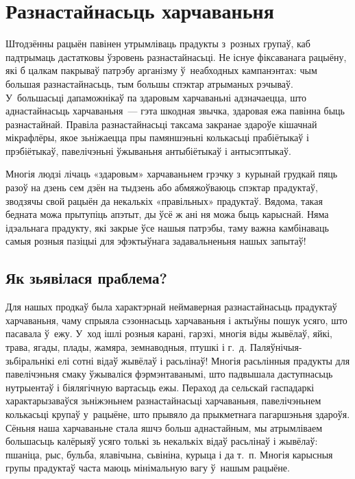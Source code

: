 \chapter{Разнастайнасьць харчаваньня}

Штодзённы рацыён павінен утрымліваць прадукты з~розных групаў, каб падтрымаць дастатковы ўзровень разнастайнасьці. Не існуе фіксаванага рацыёну, які б цалкам пакрываў патрэбу арганізму ў~неабходных кампанэнтах: чым большая разнастайнасьць, тым большы спэктар атрыманых рэчываў. У~большасьці дапаможнікаў па здаровым харчаваньні адзначаецца, што аднастайнасьць харчаваньня~--- гэта шкодная звычка, здаровая ежа павінна быць разнастайнай. Правіла разнастайнасьці таксама закранае здароўе кішачнай мікрафлёры, якое зьніжаецца пры памяншэньні колькасьці прабіётыкаў і прэбіётыкаў, павелічэньні ўжываньня антыбіётыкаў і антысэптыкаў.

Многія людзі лічаць «здаровым» харчаваньнем грэчку з~курынай грудкай пяць разоў на дзень сем дзён на тыдзень або абмяжоўваюць спэктар прадуктаў, зводзячы свой рацыён да некалькіх «правільных» прадуктаў. Вядома, такая бедната можа прытупіць апэтыт, ды ўсё ж ані ня можа быць карыснай. Няма ідэальнага прадукту, які закрые ўсе нашыя патрэбы, таму важна камбінаваць самыя розныя пазіцыі для эфэктыўнага задавальненьня нашых запытаў!

\section{Як зьявілася праблема?}

Для нашых продкаў была характэрнай неймаверная разнастайнасьць прадуктаў харчаваньня, чаму спрыяла сэзоннасьць харчаваньня і актыўны пошук усяго, што пасавала ў~ежу. У~ход ішлі розныя карані, гарэхі, многія віды жывёлаў, яйкі, трава, ягады, плады, жамяра, земнаводныя, птушкі і г.~д. Паляўнічыя-зьбіральнікі елі сотні відаў жывёлаў і расьлінаў! Многія расьлінныя прадукты для павелічэньня смаку ўжываліся фэрмэнтаванымі, што падвышала даступнасьць нутрыентаў і біялягічную вартасьць ежы. Пераход да сельскай гаспадаркі характарызаваўся зьніжэньнем разнастайнасьці харчаваньня, павелічэньнем колькасьці крупаў у~рацыёне, што прывяло да прыкметнага пагаршэньня здароўя. Сёньня наша харчаваньне стала яшчэ больш аднастайным, мы атрымліваем большасьць калёрыяў усяго толькі зь некалькіх відаў расьлінаў і жывёлаў: пшаніца, рыс, бульба, ялавічына, сьвініна, курыца і да т.~п. Многія карысныя групы прадуктаў часта маюць мінімальную вагу ў~нашым рацыёне.

